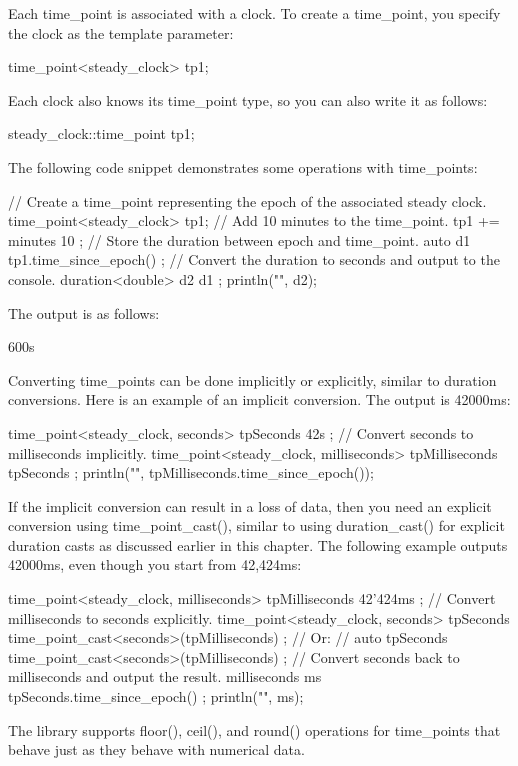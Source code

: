 Each time\_point is associated with a clock. To create a time\_point, you specify the clock as the template parameter:

\begin{cpp}
time_point<steady_clock> tp1;
\end{cpp}

Each clock also knows its time\_point type, so you can also write it as follows:

\begin{cpp}
steady_clock::time_point tp1;
\end{cpp}

The following code snippet demonstrates some operations with time\_points:

\begin{cpp}
// Create a time_point representing the epoch of the associated steady clock.
time_point<steady_clock> tp1;
// Add 10 minutes to the time_point.
tp1 += minutes { 10 };
// Store the duration between epoch and time_point.
auto d1 { tp1.time_since_epoch() };
// Convert the duration to seconds and output to the console.
duration<double> d2 { d1 };
println("{}", d2);
\end{cpp}

The output is as follows:

\begin{shell}
600s
\end{shell}

Converting time\_points can be done implicitly or explicitly, similar to duration conversions. Here is an example of an implicit conversion. The output is 42000ms:

\begin{cpp}
time_point<steady_clock, seconds> tpSeconds { 42s };
// Convert seconds to milliseconds implicitly.
time_point<steady_clock, milliseconds> tpMilliseconds { tpSeconds };
println("{}", tpMilliseconds.time_since_epoch());
\end{cpp}

If the implicit conversion can result in a loss of data, then you need an explicit conversion using time\_point\_cast(), similar to using duration\_cast() for explicit duration casts as discussed earlier in this chapter. The following example outputs 42000ms, even though you start from 42,424ms:

\begin{cpp}
time_point<steady_clock, milliseconds> tpMilliseconds { 42'424ms };
// Convert milliseconds to seconds explicitly.
time_point<steady_clock, seconds> tpSeconds {
    time_point_cast<seconds>(tpMilliseconds) };
// Or:
// auto tpSeconds { time_point_cast<seconds>(tpMilliseconds) };
// Convert seconds back to milliseconds and output the result.
milliseconds ms { tpSeconds.time_since_epoch() };
println("{}", ms);
\end{cpp}

The library supports floor(), ceil(), and round() operations for time\_points that behave just as they behave with numerical data.
